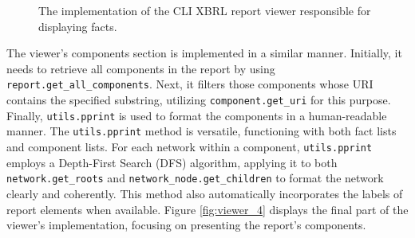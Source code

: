 \begin{figure}[H]
    \centering
    
    \caption{The implementation of the CLI XBRL report viewer responsible for displaying facts.}
    \label{fig:viewer_3}
\end{figure}

The viewer's components section is implemented in a similar manner.
Initially, it needs to retrieve all components in the report by using \texttt{report.get\_all\_components}.  
Next, it filters those components whose URI contains the specified substring, utilizing \texttt{component.get\_uri} for this purpose.  
Finally, \texttt{utils.pprint} is used to format the components in a human-readable manner.
The \texttt{utils.pprint} method is versatile, functioning with both fact lists and component lists.  
For each network within a component, \texttt{utils.pprint} employs a Depth-First Search (DFS) algorithm,  
applying it to both \texttt{network.get\_roots} and \texttt{network\_node.get\_children} to format the network clearly and coherently.  
This method also automatically incorporates the labels of report elements when available.  
Figure \ref{fig:viewer_4} displays the final part of the viewer's implementation, focusing on presenting the report's components.


